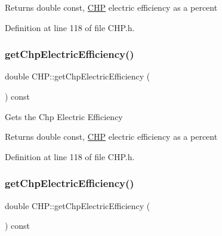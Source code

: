 \begin{DoxyReturn}{Returns}
double const, \hyperlink{class_c_h_p}{C\+HP} electric efficiency as a percent 
\end{DoxyReturn}


Definition at line 118 of file C\+H\+P.\+h.

\mbox{\label{class_c_h_p_a1d38e08a7815211361d334263832cad6}} 
\subsubsection{\texorpdfstring{get\+Chp\+Electric\+Efficiency()}{getChpElectricEfficiency()}\hspace{0.1cm}{\footnotesize\ttfamily [2/3]}}
{\footnotesize\ttfamily double C\+H\+P\+::get\+Chp\+Electric\+Efficiency (\begin{DoxyParamCaption}{ }\end{DoxyParamCaption}) const\hspace{0.3cm}{\ttfamily [inline]}}

Gets the Chp Electric Efficiency

\begin{DoxyReturn}{Returns}
double const, \hyperlink{class_c_h_p}{C\+HP} electric efficiency as a percent 
\end{DoxyReturn}


Definition at line 118 of file C\+H\+P.\+h.

\mbox{\label{class_c_h_p_a1d38e08a7815211361d334263832cad6}} 
\subsubsection{\texorpdfstring{get\+Chp\+Electric\+Efficiency()}{getChpElectricEfficiency()}\hspace{0.1cm}{\footnotesize\ttfamily [3/3]}}
{\footnotesize\ttfamily double C\+H\+P\+::get\+Chp\+Electric\+Efficiency (\begin{DoxyParamCaption}{ }\end{DoxyParamCaption}) const\hspace{0.3cm}{\ttfamily [inline]}}

